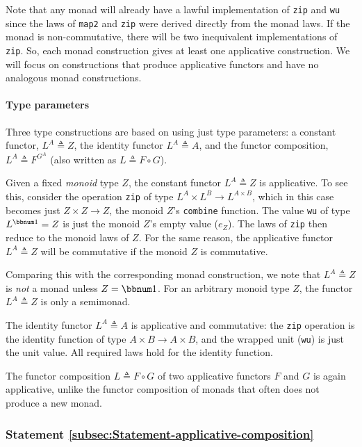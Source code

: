 Note that any monad will already have a lawful implementation of \lstinline!zip!
and \lstinline!wu! since the laws of \lstinline!map2! and \lstinline!zip!
were derived directly from the monad laws. If the monad is non-commutative,
there will be two inequivalent implementations of \lstinline!zip!.
So, each monad construction gives at least one applicative construction.
We will focus on constructions that produce applicative functors and
have no analogous monad constructions.

\paragraph{Type parameters}

Three type constructions are based on using just type parameters:
a constant functor, $L^{A}\triangleq Z$, the identity functor $L^{A}\triangleq A$,
and the functor composition, $L^{A}\triangleq F^{G^{A}}$ (also written
as $L\triangleq F\circ G$).

Given a fixed \emph{monoid} type $Z$, the constant functor $L^{A}\triangleq Z$
is applicative. To see this, consider the operation \lstinline!zip!
of type $L^{A}\times L^{B}\rightarrow L^{A\times B}$, which in this
case becomes just $Z\times Z\rightarrow Z$, the monoid $Z$\textsf{'}s \lstinline!combine!
function. The value \lstinline!wu! of type $L^{\bbnum 1}=Z$ is just
the monoid $Z$\textsf{'}s empty value ($e_{Z}$). The laws of \lstinline!zip!
then reduce to the monoid laws of $Z$. For the same reason, the applicative
functor $L^{A}\triangleq Z$ will be commutative if the monoid $Z$
is commutative.

Comparing this with the corresponding monad construction, we note
that $L^{A}\triangleq Z$ is \emph{not} a monad unless $Z=\bbnum 1$.
For an arbitrary monoid type $Z$, the functor $L^{A}\triangleq Z$
is only a semimonad.

The identity functor $L^{A}\triangleq A$ is applicative and commutative:
the \lstinline!zip! operation is the identity function of type $A\times B\rightarrow A\times B$,
and the wrapped unit (\lstinline!wu!) is just the unit value. All
required laws hold for the identity function.

The functor composition $L\triangleq F\circ G$ of two applicative
functors $F$ and $G$ is again applicative, unlike the functor composition
of monads that often does not produce a new monad.

\subsubsection{Statement \label{subsec:Statement-applicative-composition}\ref{subsec:Statement-applicative-composition}}

